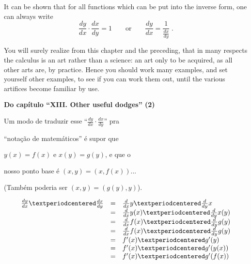 \documentclass[oneside,12pt]{article}
\begin{document}
\ssk

It can be shown that for all functions which can be put into the
inverse form, one can always write
%
$$\frac{dy}{dx} · \frac{dx}{dy} = 1
  \qquad
  \text{or}
  \qquad
  \frac{dy}{dx} = \frac{1}{\frac{dx}{dy}}
  \; .
$$


\bsk
\bsk

You will surely realize from this chapter and the preceding, that in
many respects the calculus is an art rather than a science: an art only
to be acquired, as all other arts are, by practice. Hence you should
work many examples, and set yourself other examples, to see if you can
work them out, until the various artifices become familiar by use.



\newpage


{\bf Do capítulo ``XIII. Other useful dodges'' (2)}

\ssk

Um modo de traduzir esse ``$\frac{dy}{dx} · \frac{dx}{dy}$'' pra

``notação de matemáticos'' é supor que

$y(x) = f(x)$ e $x(y) = g(y)$, e que o

nosso ponto base é $(x,y) = (x,f(x))$...

\msk

(Também poderia ser $(x,y) = (g(y),y)$).

$$\begin{array}{rcl}
  \frac{dy}{dx}·\frac{dx}{dy} &=& \ddx y · \ddy x \\
                              &=& \ddx y(x) · \ddy x(y) \\
                              &=& \ddx f(x) · \ddy g(y) \\
                              &=& \ddx f(x) · \ddy g(y) \\
                              &=& f'(x) · g'(y) \\
                              &=& f'(x) · g'(y(x)) \\
                              &=& f'(x) · g'(f(x)) \\
  \end{array}
$$
\end{document}
